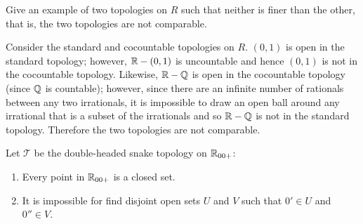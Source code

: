 \documentclass[letterpaper,12pt,fleqn]{article}
\newcommand{\T}{\mathscr{T}}
\begin{document}
\begin{example}[Exercise 3.6]
  Give an example of two topologies on \(R\) such that neither is finer than the other, that is, the two topologies
  are not comparable.

  Consider the standard and cocountable topologies on \(R\).  \((0,1)\) is open in the standard topology; however,
  \(\mathbb{R}-(0,1)\) is uncountable and hence \((0,1)\) is not in the cocountable topology.  Likewise, \(\mathbb{R}-\mathbb{Q}\) is open
  in the cocountable topology (since \(\mathbb{Q}\) is countable); however, since there are an infinite number of rationals
  between any two irrationals, it is impossible to draw an open ball around any irrational that is a subset of the
  irrationals and so \(\mathbb{R}-\mathbb{Q}\) is not in the standard topology.  Therefore the two topologies are not comparable.
\end{example}

\begin{theorem}[Exercise 3.8]
  Let \(\T\) be the double-headed snake topology on \(\mathbb{R}_{00+}\):
  \begin{enumerate}
  \item Every point in \(\mathbb{R}_{00+}\) is a closed set.
  \item It is impossible for find disjoint open sets \(U\) and \(V\) such that \(0'\in U\) and \(0''\in V\).
  \end{enumerate}
\end{theorem}
\end{document}
